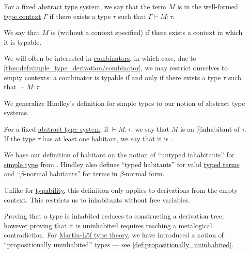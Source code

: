 \begin{definition}\label{def:typability}
  For a fixed \hyperref[def:abstract_type_system]{abstract type system}, we say that the term \( M \) is  in the \hyperref[rem:well_formed_context]{well-formed} \hyperref[def:type_context]{type context} \( \Gamma \) if there exists a type \( \tau \) such that \( \Gamma \vdash M: \tau \).

  We say that \( M \) is  (without a context specified) if there exists a context in which it is typable.
\end{definition}
\begin{comments}
  \item We will often be interested in \hyperref[def:lambda_combinator]{combinators}, in which case, due to \cref{thm:def:simple_type_derivation/combinator}, we may restrict ourselves to empty contexts: a combinator is typable if and only if there exists a type \( \tau \) such that \( \vdash M: \tau \).

  \item We generalize Hindley's definition for simple types to our notion of abstract type systems.
\end{comments}

\begin{definition}\label{def:type_habitation}
  For a fixed \hyperref[def:abstract_type_system]{abstract type system}, if \( \vdash M: \tau \), we say that \( M \) is an \term[en=untyped inhabitant (\cite[8A1]{Hindley1997BasicSTT})]{inhabitant} of \( \tau \). If the type \( \tau \) has at least one habitant, we say that it is .
\end{definition}
\begin{comments}
  \item We base our definition of habitant on the notion of \enquote{untyped inhabitants} for \hyperref[def:simple_type]{simple type} from \cite[def. 8A1]{Hindley1997BasicSTT}. Hindley also defines \enquote{typed habitants} for valid \hyperref[def:typed_lambda_term]{typed terms} and \enquote{\( \beta \)-normal habitants} for terms in \hyperref[def:lambda_term_normal_form]{\( \beta \)-normal form}.

  \item Unlike for \hyperref[def:typability]{typability}, this definition only applies to derivations from the empty context. This restricts us to inhabitants without free variables.

  \item Proving that a type is inhabited reduces to constructing a derivation tree, however proving that it is uninhabited requires reaching a metalogical contradiction. For \hyperref[def:martin_lof_type_theory]{Martin-L\"of type theory}, we have introduced a notion of \enquote{propositionally uninhabited} types --- see \cref{def:propositionally_uninhabited}.
\end{comments}

